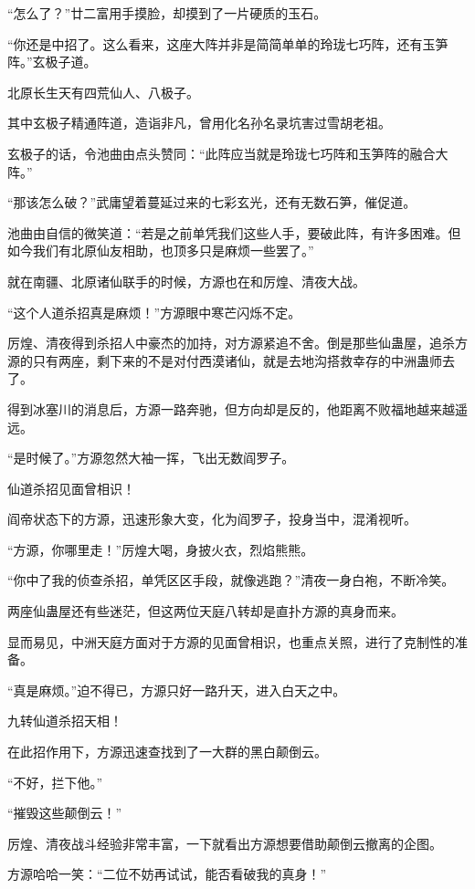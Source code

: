 \begin{this_body}
“怎么了？”廿二富用手摸脸，却摸到了一片硬质的玉石。

“你还是中招了。这么看来，这座大阵并非是简简单单的玲珑七巧阵，还有玉笋阵。”玄极子道。

北原长生天有四荒仙人、八极子。

其中玄极子精通阵道，造诣非凡，曾用化名孙名录坑害过雪胡老祖。

玄极子的话，令池曲由点头赞同：“此阵应当就是玲珑七巧阵和玉笋阵的融合大阵。”

“那该怎么破？”武庸望着蔓延过来的七彩玄光，还有无数石笋，催促道。

池曲由自信的微笑道：“若是之前单凭我们这些人手，要破此阵，有许多困难。但如今我们有北原仙友相助，也顶多只是麻烦一些罢了。”

就在南疆、北原诸仙联手的时候，方源也在和厉煌、清夜大战。

“这个人道杀招真是麻烦！”方源眼中寒芒闪烁不定。

厉煌、清夜得到杀招人中豪杰的加持，对方源紧追不舍。倒是那些仙蛊屋，追杀方源的只有两座，剩下来的不是对付西漠诸仙，就是去地沟搭救幸存的中洲蛊师去了。

得到冰塞川的消息后，方源一路奔驰，但方向却是反的，他距离不败福地越来越遥远。

“是时候了。”方源忽然大袖一挥，飞出无数阎罗子。

仙道杀招见面曾相识！

阎帝状态下的方源，迅速形象大变，化为阎罗子，投身当中，混淆视听。

“方源，你哪里走！”厉煌大喝，身披火衣，烈焰熊熊。

“你中了我的侦查杀招，单凭区区手段，就像逃跑？”清夜一身白袍，不断冷笑。

两座仙蛊屋还有些迷茫，但这两位天庭八转却是直扑方源的真身而来。

显而易见，中洲天庭方面对于方源的见面曾相识，也重点关照，进行了克制性的准备。

“真是麻烦。”迫不得已，方源只好一路升天，进入白天之中。

九转仙道杀招天相！

在此招作用下，方源迅速查找到了一大群的黑白颠倒云。

“不好，拦下他。”

“摧毁这些颠倒云！”

厉煌、清夜战斗经验非常丰富，一下就看出方源想要借助颠倒云撤离的企图。

方源哈哈一笑：“二位不妨再试试，能否看破我的真身！”


\end{this_body}
